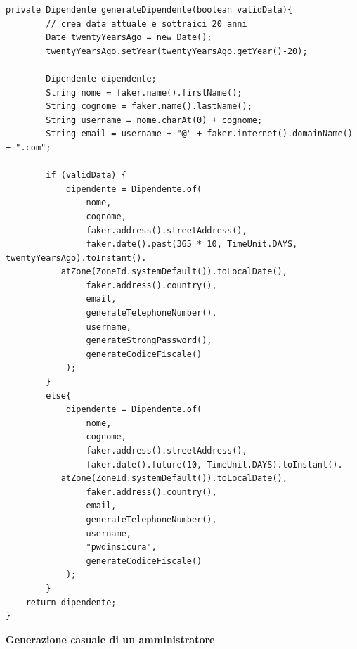 \documentclass[ 4paper,11pt,openany]{book}
\begin{document}
\begin{lstlisting}[basicstyle=\small,xleftmargin=-0.5cm,]
private Dipendente generateDipendente(boolean validData){
        // crea data attuale e sottraici 20 anni
        Date twentyYearsAgo = new Date();
        twentyYearsAgo.setYear(twentyYearsAgo.getYear()-20);

        Dipendente dipendente;
        String nome = faker.name().firstName();
        String cognome = faker.name().lastName();
        String username = nome.charAt(0) + cognome;
        String email = username + "@" + faker.internet().domainName() + ".com";

        if (validData) {
            dipendente = Dipendente.of(
                nome,
                cognome,
                faker.address().streetAddress(),
                faker.date().past(365 * 10, TimeUnit.DAYS, twentyYearsAgo).toInstant().
		   atZone(ZoneId.systemDefault()).toLocalDate(),
                faker.address().country(),
                email,
                generateTelephoneNumber(),
                username,
                generateStrongPassword(),
                generateCodiceFiscale()
            );
        }
        else{
            dipendente = Dipendente.of(
                nome,
                cognome,
                faker.address().streetAddress(),
                faker.date().future(10, TimeUnit.DAYS).toInstant().
		   atZone(ZoneId.systemDefault()).toLocalDate(),
                faker.address().country(),
                email,
                generateTelephoneNumber(),
                username,
                "pwdinsicura",
                generateCodiceFiscale()
            );
        }
	return dipendente;
}
\end{lstlisting}
\textbf{Generazione casuale di un amministratore}
\end{document}
